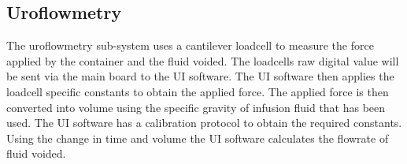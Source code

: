 \subsection{Uroflowmetry}

The uroflowmetry sub-system uses a cantilever loadcell to measure the force applied by the container and the fluid voided. The loadcells raw digital value will be sent via the main board to the UI software. The UI software then applies the loadcell specific constants to obtain the applied force. The applied force is then converted into volume using the specific gravity of infusion fluid that has been used. The UI software has a calibration protocol to obtain the required constants. 
Using the change in time and volume the UI software calculates the flowrate of fluid voided.
